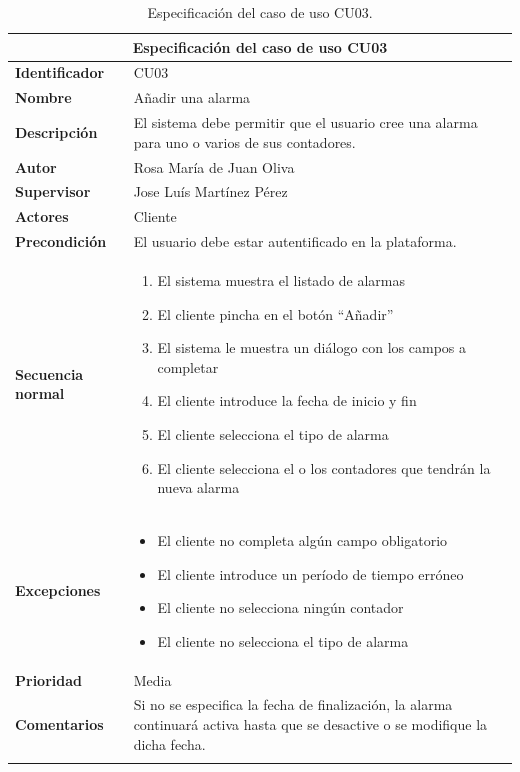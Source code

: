 \documentclass[pdftex,11pt,a4paper]{book}
\begin{document}
\begin{center}
\begin{longtable}{|m{}|m{11cm}|}
\hline
\multicolumn{2}{|c|}{\textbf{Especificación del caso de uso CU03}}\\
\hline 
\endhead

\textbf{Identificador} & CU03  
\\ \hline
\textbf{Nombre} & Añadir una alarma 
\\ \hline
\textbf{Descripción} & El sistema debe permitir que el usuario cree una alarma para uno o varios de sus contadores.  
\\ \hline
\textbf{Autor} & Rosa María de Juan Oliva 
\\ \hline
\textbf{Supervisor} & Jose Luís Martínez Pérez  
\\ \hline
\textbf{Actores} & Cliente 
\\ \hline
\textbf{Precondición} & El usuario debe estar autentificado en la plataforma. 
\\ \hline
\textbf{Secuencia normal} & 
\begin{enumerate}
\addtolength{\itemsep}{-3mm}
\item El sistema muestra el listado de alarmas
\item El cliente pincha en el botón “Añadir”
\item El sistema le muestra un diálogo con los campos a completar
\item El cliente introduce la fecha de inicio y fin
\item El cliente selecciona el tipo de alarma
\item El cliente selecciona el o los contadores que tendrán la nueva alarma
\end{enumerate}
\\ \hline
\textbf{Excepciones} &
\begin{itemize}
\addtolength{\itemsep}{-3mm}
\item El cliente no completa algún campo obligatorio
\item El cliente introduce un período de tiempo erróneo
\item El cliente no selecciona ningún contador
\item El cliente no selecciona el tipo de alarma
\end{itemize}
\\ \hline
\textbf{Prioridad} & Media 
\\ \hline
\textbf{Comentarios} & Si no se especifica la fecha de finalización, la alarma continuará activa hasta que se desactive o se modifique la dicha fecha.
\\ \hline

\caption{Especificación del caso de uso CU03.} \label{tablalarga:tablaCU03}
\end{longtable}
\end{center}
\end{document}
